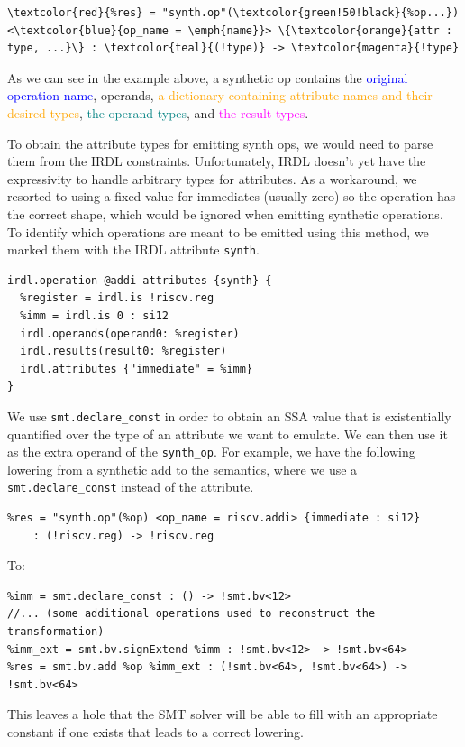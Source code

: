 \begin{Verbatim}[commandchars=\\\{\}, fontsize=\small]
\textcolor{red}{%res} = "synth.op"(\textcolor{green!50!black}{%op...}) <\textcolor{blue}{op_name = \emph{name}}> \{\textcolor{orange}{attr : type, ...}\} : \textcolor{teal}{(!type)} -> \textcolor{magenta}{!type}
\end{Verbatim}

As we can see in the example above, a synthetic op contains the \textcolor{blue}{original operation name},
\textcolor{green!50!black}{operands}, \textcolor{orange}{a dictionary containing attribute names and 
their desired types}, \textcolor{teal}{the operand types}, and \textcolor{magenta}{the result types}.

To obtain the attribute types for emitting synth ops, we would need to parse them from the IRDL constraints.
Unfortunately, IRDL doesn't yet have the expressivity to handle arbitrary types for
attributes. As a workaround, we resorted to using a fixed value for immediates (usually zero)
so the operation has the correct shape, which would be ignored when emitting synthetic operations.
To identify which operations are meant to be emitted using this method, we marked them with the IRDL
attribute \texttt{synth}.
\begin{verbatim}
irdl.operation @addi attributes {synth} {
  %register = irdl.is !riscv.reg
  %imm = irdl.is 0 : si12 
  irdl.operands(operand0: %register)
  irdl.results(result0: %register)
  irdl.attributes {"immediate" = %imm}
}
\end{verbatim}

We use \texttt{smt.declare\_const} in order to obtain an SSA value that is existentially 
quantified over the type of an attribute we want to emulate. We can then use it as the extra 
operand of the \texttt{synth\_op}. For example, we have the following lowering from a synthetic 
add to the semantics, where we use a \texttt{smt.declare\_const} instead of the attribute.

\begin{verbatim}
%res = "synth.op"(%op) <op_name = riscv.addi> {immediate : si12} 
    : (!riscv.reg) -> !riscv.reg
\end{verbatim}
To:
\begin{verbatim}
%imm = smt.declare_const : () -> !smt.bv<12>
//... (some additional operations used to reconstruct the transformation)
%imm_ext = smt.bv.signExtend %imm : !smt.bv<12> -> !smt.bv<64>
%res = smt.bv.add %op %imm_ext : (!smt.bv<64>, !smt.bv<64>) -> !smt.bv<64>
\end{verbatim}
This leaves a hole that the SMT solver will be able to fill with an appropriate constant if one
exists that leads to a correct lowering.

